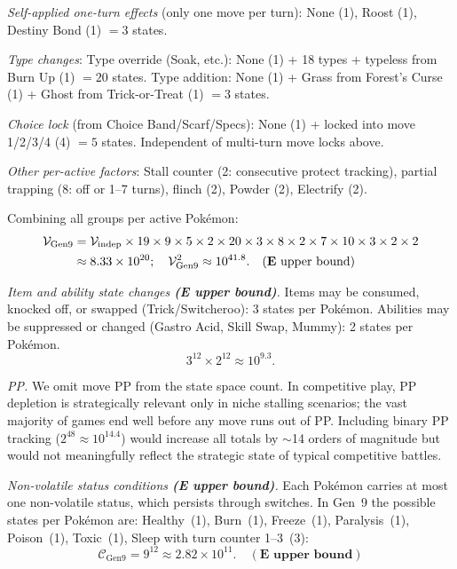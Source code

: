 \emph{Self-applied one-turn effects} (only one move per turn):
None (1), Roost (1), Destiny Bond (1) $= 3$ states.

\emph{Type changes}:
Type override (Soak, etc.): None (1) + 18 types + typeless from Burn Up (1) $= 20$ states.
Type addition: None (1) + Grass from Forest's Curse (1) + Ghost from Trick-or-Treat (1) $= 3$ states.

\emph{Choice lock} (from Choice Band/Scarf/Specs):
None (1) + locked into move 1/2/3/4 (4) $= 5$ states. Independent of multi-turn move locks above.

\emph{Other per-active factors}:
Stall counter (2: consecutive protect tracking), partial trapping (8: off or 1--7 turns), flinch (2), Powder (2), Electrify (2).

Combining all groups per active Pok\'emon:
\begin{align}
    \mathcal{V}_{\text{Gen9}} &= \mathcal{V}_{\text{indep}} \times 19 \times 9 \times 5 \times 2 \times 20 \times 3 \times 8 \times 2 \times 7 \times 10 \times 3 \times 2 \times 2 \notag \\
    &\approx 8.33 \times 10^{20}; \quad \mathcal{V}_{\text{Gen9}}^2 \approx 10^{41.8}. \quad \mathbf{(E\text{ upper bound})}
\end{align}

\emph{Item and ability state changes \textbf{(E upper bound)}.}
Items may be consumed, knocked off, or swapped (Trick/Switcheroo): 3 states per Pok\'emon.
Abilities may be suppressed or changed (Gastro Acid, Skill Swap, Mummy): 2 states per Pok\'emon.
\begin{equation}
    3^{12} \times 2^{12} \approx 10^{9.3}.
\end{equation}

\emph{PP.}
We omit move PP from the state space count. In competitive play, PP depletion is strategically relevant only in niche stalling scenarios; the vast majority of games end well before any move runs out of PP. Including binary PP tracking ($2^{48} \approx 10^{14.4}$) would increase all totals by $\sim$14 orders of magnitude but would not meaningfully reflect the strategic state of typical competitive battles.


\emph{Non-volatile status conditions \textbf{(E upper bound)}.}
Each Pok\'emon carries at most one non-volatile status, which persists through switches.
In Gen~9 the possible states per Pok\'emon are:
Healthy~(1), Burn~(1), Freeze~(1), Paralysis~(1), Poison~(1), Toxic~(1), Sleep with turn counter 1--3~(3):
\begin{equation}
    \mathcal{C}_{\text{Gen9}} = 9^{12} \approx 2.82 \times 10^{11}. \quad \mathbf{(E\text{ upper bound})}
\end{equation}

